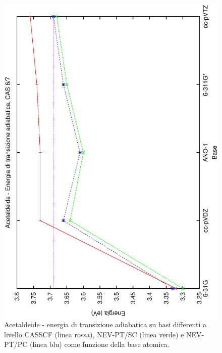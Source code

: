 \begin{figure}[ht]
\begin{center}
\includegraphics[angle=270,width=12cm,keepaspectratio]{immagini/acetaldeide/energie_adiab_7.eps}
\parbox[h]{12cm}{
\caption{\small Acetaldeide - energia di transizione adiabatica su basi differenti a livello CASSCF (linea rossa), NEV-PT/SC (linea verde) e NEV-PT/PC (linea blu) come funzione della base atomica.}
\label{fig:acetaldeide_energie_adiab_7}
}
\end{center}
\end{figure}

\clearpage
